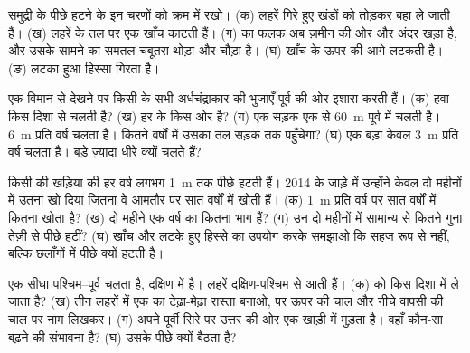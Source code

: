 \begin{exercise}[$\star$]\label{exo:g9:landforms:4}
समुद्री  के पीछे हटने के इन चरणों को क्रम में रखो। (क) लहरें गिरे हुए खंडों को तोड़कर
बहा ले जाती हैं। (ख) लहरें  के तल पर एक खाँच काटती हैं। (ग)  का फलक अब ज़मीन की
ओर और अंदर खड़ा है, और उसके सामने का समतल चबूतरा थोड़ा और चौड़ा है। (घ) खाँच के ऊपर की
 आगे लटकती है। (ङ) लटका हुआ हिस्सा गिरता
है।
\end{exercise}

\begin{exercise}[$\star\star$]\label{exo:g9:landforms:5}
एक विमान से देखने पर किसी  के सभी अर्धचंद्राकार  की भुजाएँ पूर्व की ओर इशारा
करती हैं। (क) हवा किस दिशा से चलती है? (ख) हर  के किस ओर  है? (ग) एक
सड़क एक  से \qty{60}{m} पूर्व में चलती है।  \qty{6}{m} प्रति वर्ष चलता है।
कितने वर्षों में उसका तल सड़क तक पहुँचेगा? (घ) एक बड़ा  केवल \qty{3}{m} प्रति
वर्ष चलता है। बड़े  ज़्यादा धीरे क्यों चलते
हैं?
\end{exercise}

\begin{exercise}[$\star\star$]\label{exo:g9:landforms:6}
किसी  की खड़िया की  हर वर्ष लगभग \qty{1}{m} तक पीछे हटती हैं। 2014 के जाड़े में
उन्होंने केवल दो महीनों में उतना खो दिया जितना वे आमतौर पर सात वर्षों में खोती हैं।
(क) \qty{1}{m} प्रति वर्ष पर सात वर्षों में कितना खोता है? (ख) दो महीने एक वर्ष का कितना
भाग हैं? (ग) उन दो महीनों में  सामान्य से कितने गुना तेज़ी से पीछे हटीं? (घ) खाँच और
लटके हुए हिस्से का उपयोग करके समझाओ कि  सहज रूप से नहीं, बल्कि छलाँगों में पीछे क्यों
हटती
है।
\end{exercise}

\begin{exercise}[$\star\star$]\label{exo:g9:landforms:7}
एक सीधा  पश्चिम--पूर्व चलता है,  दक्षिण में है। लहरें दक्षिण-पश्चिम से आती हैं।
(क)   को किस दिशा में ले जाता है? (ख) तीन लहरों में एक  का टेढ़ा-मेढ़ा
रास्ता बनाओ,  पर ऊपर की चाल और नीचे वापसी की चाल पर नाम लिखकर। (ग) अपने पूर्वी
सिरे पर  उत्तर की ओर एक खाड़ी में मुड़ता है। वहाँ कौन-सा  बढ़ने की संभावना है?
(घ) उसके पीछे  क्यों बैठता
है?
\end{exercise}

